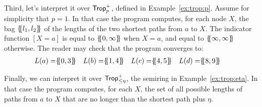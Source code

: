 \begin{ex}
  Third, let's interpret it over $\text{\sf Trop}^+_p$, defined in
  Example~\ref{ex:trop:p}.  Assume for simplicity that $p=1$.  In that
  case the program computes, for each node $X$, the bag
  $\{\hspace{-1mm}\{l_1,l_2\}\hspace{-1mm}\}$ of the lengths of the two shortest paths from $a$ to
  $X$.  The indicator function $[X=a]$ is equal to $\{\hspace{-1mm}\{0,\infty\}\hspace{-1mm}\}$
  when $X=a$, and equal to $\{\hspace{-1mm}\{\infty,\infty\}\hspace{-1mm}\}$ otherwise.  The
  reader may check that the program converges to:
  \begin{align*}
    L(a) = &\bag{0,3} & L(b) = & \bag{1,4} &
    L(c) = &\bag{4,5} & L(d) = & \bag{8,9}
  \end{align*}

  Finally, we can interpret it over $\text{\sf Trop}^+_{\leq \eta}$, the
  semiring in Example~\ref{ex:trop:eta}.  In that case the program
  computes, for each $X$, the set of all possible lengths of paths
  from $a$ to $X$ that are no longer than the shortest path plus
  $\eta$.
\end{ex}



